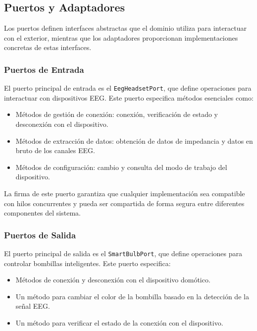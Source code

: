 \subsection{Puertos y Adaptadores}

Los puertos definen interfaces abstractas que el dominio utiliza para interactuar con el exterior, mientras que los adaptadores proporcionan implementaciones concretas de estas interfaces.

\subsubsection{Puertos de Entrada}

El puerto principal de entrada es el \texttt{EegHeadsetPort}, que define operaciones para interactuar con dispositivos EEG. Este puerto especifica métodos esenciales como:

\begin{itemize}
    \item Métodos de gestión de conexión: conexión, verificación de estado y desconexión con el dispositivo.
    \item Métodos de extracción de datos: obtención de datos de impedancia y datos en bruto de los canales EEG.
    \item Métodos de configuración: cambio y consulta del modo de trabajo del dispositivo.
\end{itemize}

La firma de este puerto garantiza que cualquier implementación sea compatible con hilos concurrentes y pueda ser compartida de forma segura entre diferentes componentes del sistema.

\subsubsection{Puertos de Salida}

El puerto principal de salida es el \texttt{SmartBulbPort}, que define operaciones para controlar bombillas inteligentes. Este puerto especifica:

\begin{itemize}
    \item Métodos de conexión y desconexión con el dispositivo domótico.
    \item Un método para cambiar el color de la bombilla basado en la detección de la señal EEG.
    \item Un método para verificar el estado de la conexión con el dispositivo.
\end{itemize}

